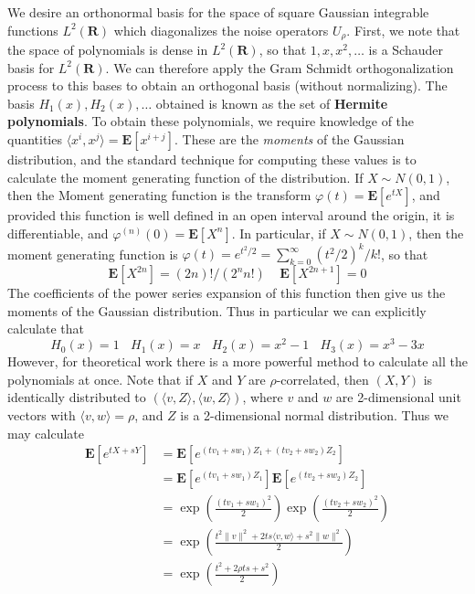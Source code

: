 We desire an orthonormal basis for the space of square Gaussian integrable functions $L^2(\mathbf{R})$ which diagonalizes the noise operators $U_\rho$. First, we note that the space of polynomials is dense in $L^2(\mathbf{R})$, so that $1, x, x^2, \dots$ is a Schauder basis for $L^2(\mathbf{R})$. We can therefore apply the Gram Schmidt orthogonalization process to this bases to obtain an orthogonal basis (without normalizing). The basis $H_1(x), H_2(x), \dots$ obtained is known as the set of {\bf Hermite polynomials}. To obtain these polynomials, we require knowledge of the quantities $\langle x^i, x^j \rangle = \mathbf{E}[x^{i+j}]$. These are the {\it moments} of the Gaussian distribution, and the standard technique for computing these values is to calculate the moment generating function of the distribution. If $X \sim N(0,1)$, then the Moment generating function is the transform $\varphi(t) = \mathbf{E}[e^{tX}]$, and provided this function is well defined in an open interval around the origin, it is differentiable, and $\varphi^{(n)}(0) = \mathbf{E}[X^n]$. In particular, if $X \sim N(0,1)$, then the moment generating function is $\varphi(t) = e^{t^2/2} = \sum_{k = 0}^\infty (t^2/2)^k/k!$, so that
%
\[ \mathbf{E}[X^{2n}] = (2n)!/(2^n n!) \ \ \ \ \ \mathbf{E}[X^{2n+1}] = 0 \]
%
The coefficients of the power series expansion of this function then give us the moments of the Gaussian distribution. Thus in particular we can explicitly calculate that
%
\[ H_0(x) = 1\ \ \ \ H_1(x) = x\ \ \ \ H_2(x) = x^2 - 1\ \ \ \ H_3(x) = x^3 - 3x \]
%
However, for theoretical work there is a more powerful method to calculate all the polynomials at once. Note that if $X$ and $Y$ are $\rho$-correlated, then $(X,Y)$ is identically distributed to $(\langle v, Z \rangle, \langle w, Z \rangle)$, where $v$ and $w$ are 2-dimensional unit vectors with $\langle v, w \rangle = \rho$, and $Z$ is a 2-dimensional normal distribution. Thus we may calculate
%
\begin{align*}
    \mathbf{E}[e^{tX + sY}] &= \mathbf{E}[e^{(tv_1 + sw_1) Z_1 + (tv_2 + sw_2) Z_2}]\\
    &= \mathbf{E}[e^{(tv_1 + sw_1) Z_1}] \mathbf{E}[e^{(tv_2 + sw_2) Z_2}]\\
    &= \exp \left( \frac{(tv_1 + sw_1)^2}{2} \right) \exp \left( \frac{(tv_2 + sw_2)^2}{2} \right)\\
    &= \exp \left( \frac{t^2 \| v \|^2 + 2ts \langle v, w \rangle + s^2 \| w \|^2}{2}  \right)\\
    &= \exp \left( \frac{t^2 + 2 \rho t s + s^2}{2} \right)
\end{align*}
